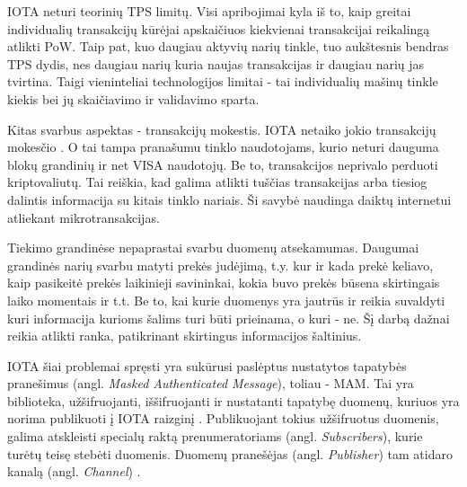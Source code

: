 IOTA neturi teorinių TPS limitų. Visi apribojimai kyla iš to, kaip greitai individualių transakcijų kūrėjai apskaičiuos kiekvienai transakcijai reikalingą atlikti PoW. Taip pat, kuo daugiau aktyvių narių tinkle, tuo aukštesnis bendras TPS dydis, nes daugiau narių kuria naujas transakcijas ir daugiau narių jas tvirtina. Taigi vieninteliai technologijos limitai - tai individualių mašinų tinkle kiekis bei jų skaičiavimo ir validavimo sparta.

Kitas svarbus aspektas - transakcijų mokestis. IOTA netaiko jokio transakcijų mokesčio \cite{zivic2019distributed}. O tai tampa pranašumu tinklo naudotojams, kurio neturi dauguma blokų grandinių ir net VISA naudotojų. Be to, transakcijos neprivalo perduoti kriptovaliutų. Tai reiškia, kad galima atlikti tuščias transakcijas arba tiesiog dalintis informacija su kitais tinklo nariais. Ši savybė naudinga daiktų internetui atliekant mikrotransakcijas.





Tiekimo grandinėse nepaprastai svarbu duomenų atsekamumas. Daugumai grandinės narių svarbu matyti prekės judėjimą, t.y. kur ir kada prekė keliavo, kaip pasikeitė prekės laikinieji savininkai, kokia buvo prekės būsena skirtingais laiko momentais ir t.t. Be to, kai kurie duomenys yra jautrūs ir reikia suvaldyti kuri informacija kurioms šalims turi būti prieinama, o kuri - ne. Šį darbą dažnai reikia atlikti ranka, patikrinant skirtingus informacijos šaltinius.

IOTA šiai problemai spręsti yra sukūrusi paslėptus nustatytos tapatybės pranešimus (angl. \textit{Masked Authenticated Message}), toliau - MAM. Tai yra biblioteka, užšifruojanti, iššifruojanti ir nustatanti tapatybę duomenų, kuriuos yra norima publikuoti į IOTA raizginį \cite{andreas2017masked}. Publikuojant tokius užšifruotus duomenis, galima atskleisti specialų raktą prenumeratoriams (angl. \textit{Subscribers}), kurie turėtų teisę stebėti duomenis. Duomenų pranešėjas (angl. \textit{Publisher}) tam atidaro kanalą (angl. \textit{Channel}) \cite{ab2018iota}.

